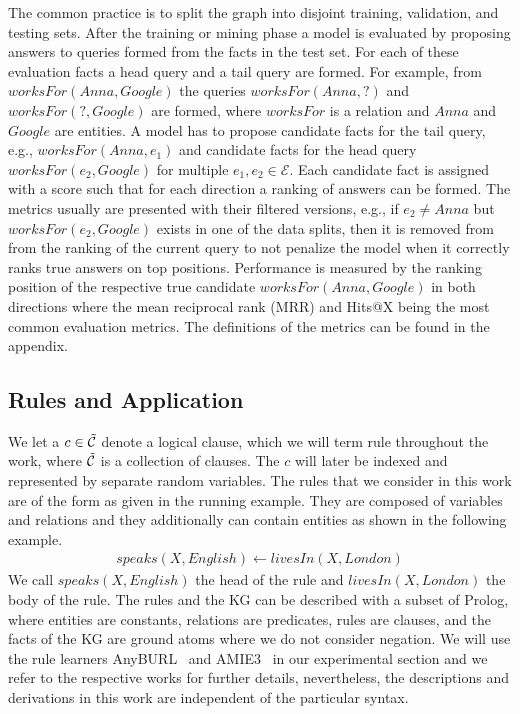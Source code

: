 \documentclass{article}
\theoremstyle{plain}
\theoremstyle{remark}
\newcommand{\allatomrules}{\Tilde{\mathcal{C}}}
\newcommand{\alltriples}{\mathcal{G}}
\begin{document}
The common practice is to split the graph into disjoint training, validation, and testing sets. %
After the training or mining phase a model is evaluated by proposing answers to queries formed from the facts in the test set. For each of these evaluation facts a head query and a tail query are formed. For example, from $worksFor(Anna,Google)$ the queries  $worksFor(Anna, ?)$ and $worksFor(?, Google)$ are formed, where $worksFor$ is a relation and $Anna$ and $Google$ are entities. A model has to propose candidate facts for the tail query, e.g., $worksFor(Anna, e_1)$ and candidate facts for the head query $worksFor(e_2, Google)$ for multiple $e_1, e_2 \in \mathcal{E}$.  Each candidate fact is assigned with a score such that for each direction a ranking of answers can be formed. The metrics usually are presented with their filtered versions, e.g., if $e_2 \neq Anna$ but $worksFor(e_2, Google)$ exists in one of the data splits, then it is removed from from the ranking of the current query to not penalize the model when it correctly ranks true answers on top positions. Performance is measured by the ranking position of the respective true candidate $worksFor(Anna,Google)$ in both directions where the mean reciprocal rank (MRR) and Hits@X being the most common evaluation metrics. The definitions of the metrics can be found in the appendix.

\subsection{Rules and Application} \label{sec: Application}
We let a $c \in \allatomrules$ denote a logical clause, which we will term rule throughout the work, where $\allatomrules$ is a collection of clauses. The $c$ will later be indexed and represented by separate random variables. The rules that we consider in this work are of the form as given in the running example. They are composed of variables and relations and they additionally can contain entities as shown in the following example.
\begin{align*}
    speaks(X,English)\leftarrow livesIn(X,London)
\end{align*}
We call $speaks(X,English)$ the head of the rule and $livesIn(X,London)$ the body of the rule. The rules and the KG can be described with a subset of Prolog, where entities are constants, relations are predicates, rules are clauses, and the facts of the KG are ground atoms where we do not consider negation. We will use the rule learners AnyBURL~\cite{meilicke2019anyburl} and AMIE3~\cite{lajus2020fast} in our experimental section and we refer to the respective works for further details, nevertheless, the descriptions and derivations in this work are independent of the particular syntax.
\end{document}
